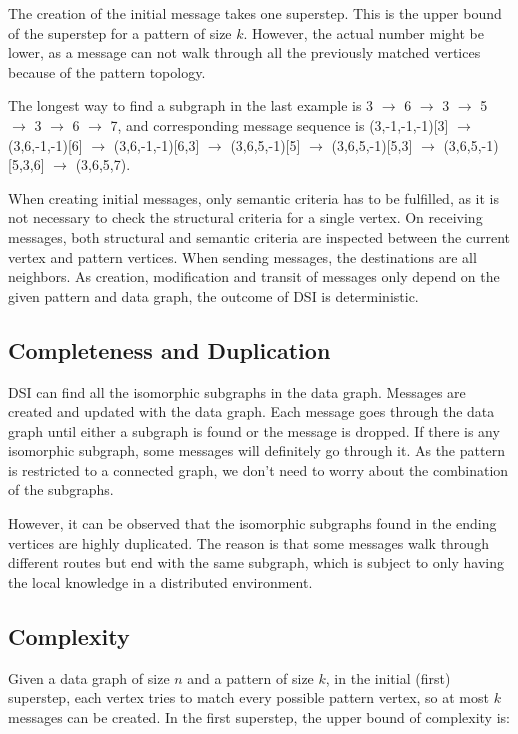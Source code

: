 The creation of the initial message takes one superstep. This is the upper bound of the superstep for a pattern of size $k$. However, the actual number might be lower, as a message can not walk through all the previously matched vertices because of the pattern topology.

The longest way to find a subgraph in the last example is 3 $\rightarrow$ 6 $\rightarrow$ 3 $\rightarrow$ 5 $\rightarrow$ 3 $\rightarrow$ 6 $\rightarrow$ 7, and corresponding message sequence is (3,-1,-1,-1)[3] $\rightarrow$ (3,6,-1,-1)[6] $\rightarrow$ (3,6,-1,-1)[6,3] $\rightarrow$ (3,6,5,-1)[5] $\rightarrow$ (3,6,5,-1)[5,3] $\rightarrow$ (3,6,5,-1)[5,3,6] $\rightarrow$ (3,6,5,7).

When creating initial messages, only semantic criteria has to be fulfilled, as it is not necessary to check the structural criteria for a single vertex. On receiving messages, both structural and semantic criteria are inspected between the current vertex and pattern vertices. When sending messages, the destinations are all neighbors. As creation, modification and transit of messages only depend on the given pattern and data graph, the outcome of DSI is deterministic.

\subsection{Completeness and Duplication}

DSI can find all the isomorphic subgraphs in the data graph. Messages are created and updated with the data graph.	Each message goes through the data graph until either a subgraph is found or the message is dropped. If there is any isomorphic subgraph, some messages will definitely go through it. As the pattern is restricted to a connected graph, we don't need to worry about the combination of the subgraphs.

However, it can be observed that the isomorphic subgraphs found in the ending vertices are highly duplicated. The reason is that some messages walk through different routes but end with the same subgraph, which is subject to only having the local knowledge in a distributed environment.

\subsection{Complexity}

Given a data graph of size $n$ and a pattern of size $k$, in the initial (first) superstep, each vertex tries to match every possible pattern vertex, so at most $k$ messages can be created. In the first superstep, the upper bound of complexity is:

